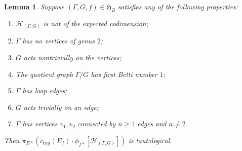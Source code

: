 \documentclass[12pt]{amsart}
\newtheorem{lem}[thm]{Lemma}
\theoremstyle{definition}
\newcommand{\Hb}{\overline{\mathcal{H}}}
\begin{document}
\begin{lem}\label{tautterms}
    Suppose $(\Gamma,G,f)\in \mathfrak{H}_B$ satisfies any of the following properties:

    \begin{enumerate}
        \item $\Hb_{(\Gamma,G)}$ is not of the expected codimension;
        \item $\Gamma$ has no vertices of genus $2$;
        \item $G$ acts nontrivially on the vertices;
        \item The quotient graph $\Gamma/G$ has first Betti number $1$;
        \item $\Gamma$ has loop edges;
        \item $G$ acts trivially on an edge;
        \item $\Gamma$ has vertices $v_1,v_2$ connected by $n\geq 1$ edges and $n\neq 2$.
    
    \end{enumerate}
Then $\pi_{B*}\left(c_{\mathrm{top}}(E_f)\cdot \phi_{f*}[\Hb_{(\Gamma,G)}]\right)$ is tautological.
\end{lem}
\end{document}
